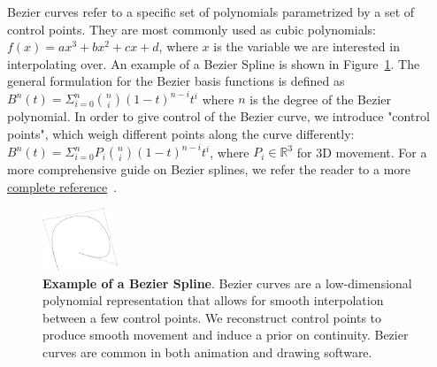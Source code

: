 Bezier curves refer to a specific set of polynomials parametrized by a set of control points. They are most commonly used as cubic polynomials: $f(x) = ax^3 + bx^2 + cx + d$,
where $x$ is the variable we are interested in interpolating over. An example of a Bezier Spline is shown in Figure~\ref{fig:bezier_diagram}. The general formulation for
the Bezier basis functions is defined as $B^n(t) = \Sigma^n_{i=0}
{n \choose i} (1-t)^{n-i} t^i$ where $n$
is the degree of the Bezier polynomial. In order to give control of the Bezier curve, we
introduce "control points", which weigh different points along the curve differently:
$B^n(t) = \Sigma^n_{i=0} P_i {n \choose i} (1-t)^{n-i} t^i$, where $P_i\in\mathbb{R}^3$ for 3D
movement. For a more comprehensive guide on Bezier splines, we refer the reader to a more
\href{https://pomax.github.io/bezierinfo/index.html}{complete reference}~\cite{bezier_primer}.

\begin{figure}
    \centering
    \includegraphics[width=0.2\textwidth]{bezier_curve.png}
    \caption{
        \textbf{Example of a Bezier Spline}.
        Bezier curves are a low-dimensional polynomial representation that allows for smooth interpolation between a few control points. We reconstruct control points to produce smooth movement and induce a prior on continuity. Bezier curves are common in both animation and drawing software.
    }
    \label{fig:bezier_diagram}
\end{figure}


